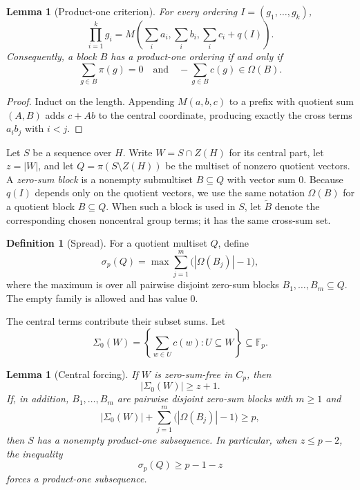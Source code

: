 \documentclass[11pt]{amsart}
\newtheorem{lemma}[theorem]{Lemma}
\theoremstyle{definition}
\newtheorem{definition}[theorem]{Definition}
\newcommand{\F}{\mathbb F}
\newcommand{\Om}{\Omega}
\newcommand{\Sig}{\Sigma}
\begin{document}
\begin{lemma}[Product-one criterion]\label{lem:criterion}
For every ordering $I=(g_1,\ldots,g_k)$,
\[
\prod_{i=1}^k g_i
=M\!\left(\sum_i a_i,\sum_i b_i,\sum_i c_i+q(I)\right).
\]
Consequently, a block $B$ has a product-one ordering if and only if
\[
\sum_{g\in B}\pi(g)=0
\quad\text{and}\quad
-\sum_{g\in B} c(g)\in\Om(B).
\]
\end{lemma}

\begin{proof}
Induct on the length. Appending $M(a,b,c)$ to a prefix with quotient
sum $(A,B)$ adds $c+Ab$ to the central coordinate, producing exactly
the cross terms $a_i b_j$ with $i<j$.
\end{proof}

Let $S$ be a sequence over $H$.  Write $W=S\cap Z(H)$ for its central
part, let $z=|W|$, and let $Q=\pi(S\setminus Z(H))$ be the multiset of
nonzero quotient vectors.  A \emph{zero-sum block} is a nonempty
submultiset $B\subseteq Q$ with vector sum $0$.
Because $q(I)$ depends only on the quotient vectors, we use the same
notation $\Om(B)$ for a quotient block $B\subseteq Q$.  When such a
block is used in $S$, let $\widetilde B$ denote the corresponding
chosen noncentral group terms; it has the same cross-sum set.

\begin{definition}[Spread]\label{def:spread}
For a quotient multiset $Q$, define
\[
\sigma_p(Q)=\max\sum_{j=1}^m\bigl(|\Om(B_j)|-1\bigr),
\]
where the maximum is over all pairwise disjoint zero-sum blocks
$B_1,\ldots,B_m\subseteq Q$.  The empty family is allowed and has value
$0$.
\end{definition}

The central terms contribute their subset sums.  Let
\[
\Sig_0(W)=\left\{\sum_{w\in U}c(w):U\subseteq W\right\}\subseteq\F_p.
\]

\begin{lemma}[Central forcing]\label{lem:forcing}
If $W$ is zero-sum-free in $C_p$, then
\[
|\Sig_0(W)|\geq z+1.
\]
If, in addition, $B_1,\ldots,B_m$ are pairwise disjoint zero-sum
blocks with $m\geq1$ and
\[
|\Sig_0(W)|+\sum_{j=1}^m\bigl(|\Om(B_j)|-1\bigr)\geq p,
\]
then $S$ has a nonempty product-one subsequence.  In particular, when
$z\leq p-2$, the inequality
\[
\sigma_p(Q)\geq p-1-z
\]
forces a product-one subsequence.
\end{lemma}
\end{document}
